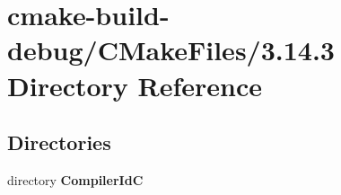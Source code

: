 \section{cmake-\/build-\/debug/\+C\+Make\+Files/3.14.3 Directory Reference}
\label{dir_3d3c8ff3ebf9841b39117ac899f41936}
\subsection*{Directories}
\begin{DoxyCompactItemize}
\item 
directory {\bf Compiler\+IdC}
\end{DoxyCompactItemize}
